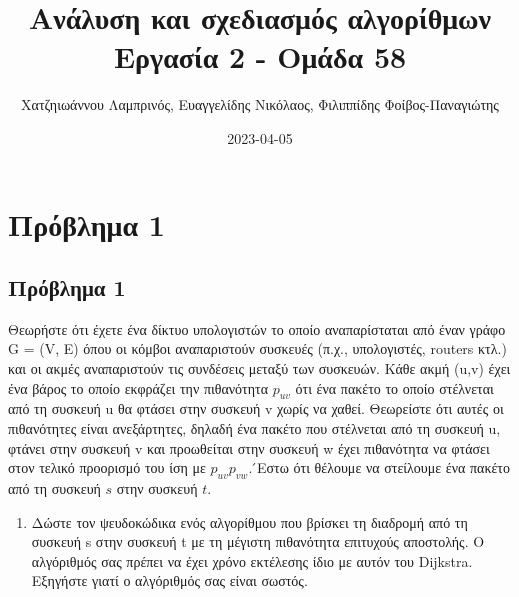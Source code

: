 \documentclass[11pt]{article}
\author{Χατζηιωάννου Λαμπρινός, Ευαγγελίδης Νικόλαος, Φιλιππίδης Φοίβος-Παναγιώτης}
\date{2023-04-05}
\title{Ανάλυση και σχεδιασμός αλγορίθμων\\\medskip
\large Εργασία 2 - Ομάδα 58}
\begin{document}
\maketitle
\section{Πρόβλημα 1}
\label{sec:org3e8e36f}
\subsection{Πρόβλημα 1}
\label{sec:orgff733d0}
Θεωρήστε ότι έχετε ένα δίκτυο υπολογιστών το οποίο αναπαρίσταται από έναν γράφο
G = (V, E) όπου οι κόμβοι αναπαριστούν συσκευές (π.χ., υπολογιστές, routers
κτλ.) και οι ακμές αναπαριστούν τις συνδέσεις μεταξύ των συσκευών. Κάθε ακμή
(u,v) έχει ένα βάρος το οποίο εκφράζει την πιθανότητα \(p_{uv}\) ότι ένα πακέτο το
οποίο στέλνεται από τη συσκευή u θα φτάσει στην συσκευή v χωρίς να χαθεί.
Θεωρείστε ότι αυτές οι πιθανότητες είναι ανεξάρτητες, δηλαδή ένα πακέτο που
στέλνεται από τη συσκευή u, φτάνει στην συσκευή v και προωθείται στην συσκευή w
έχει πιθανότητα να φτάσει στον τελικό προορισμό του ίση με \(p_{uv}p_{vw}\). ́Εστω ότι
θέλουμε να στείλουμε ένα πακέτο από τη συσκευή \(s\) στην συσκευή \(t\).

\begin{enumerate}
\item Δώστε τον ψευδοκώδικα ενός αλγορίθμου που βρίσκει τη διαδρομή από τη συσκευή
s στην συσκευή t με τη μέγιστη πιθανότητα επιτυχούς αποστολής. Ο αλγόριθμός
σας πρέπει να έχει χρόνο εκτέλεσης ίδιο με αυτόν του Dijkstra. Εξηγήστε γιατί
ο αλγόριθμός σας είναι σωστός.
\end{enumerate}
\end{document}
